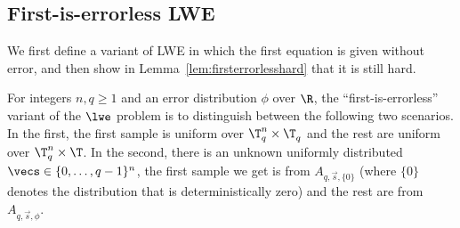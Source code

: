 
\subsection{First-is-errorless LWE}
\label{sec:firstiserrorless}

We first define a variant of LWE in which the first equation is given without error, and then show in
Lemma~\ref{lem:firsterrorlesshard} that it is still hard. 

\begin{definition}\label{def:firsterrorless}
For integers $n,q \ge 1$ and an error distribution $\phi$ over $\R$, the ``first-is-errorless'' variant of the $\lwe$ problem
is to distinguish between the following two scenarios.
In the first, the first sample is uniform over $\T_q^n \times \T_q^{}$ and the rest are uniform
over $\T_q^n \times \T$. In the second, there is an unknown uniformly distributed $\vecs \in \{0,\ldots,q-1\}^n$,
the first sample we get is from $A_{q,\vec{s},\{0\}}$ (where $\{0\}$ denotes the distribution that is deterministically zero)
and the rest are from $A_{q,\vec{s},\phi}$.
\end{definition}


